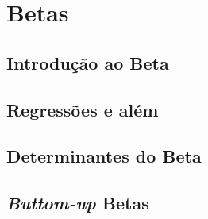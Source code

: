 \chapter{Betas}
\section{Introdução ao Beta}

\section{Regressões e além}

\section{Determinantes do Beta}

\section{\textit{Buttom-up} Betas}
